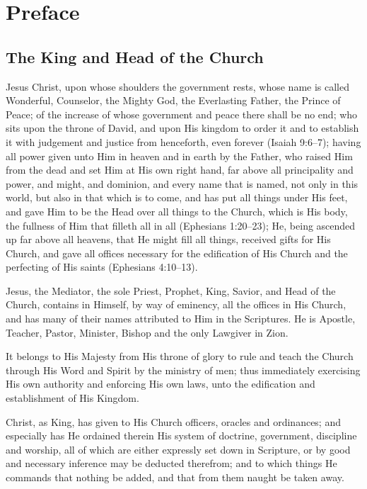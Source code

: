 \documentclass[
]{book}
\begin{document}
\hypertarget{preface}{%
\chapter{Preface}\label{preface}}

\hypertarget{the-king-and-head-of-the-church}{%
\section*{The King and Head of the Church}\label{the-king-and-head-of-the-church}}

Jesus Christ, upon whose shoulders the government rests, whose name is called Wonderful, Counselor, the Mighty God, the Everlasting Father, the Prince of Peace; of the increase of whose government and peace there shall be no end; who sits upon the throne of David, and upon His kingdom to order it and to establish it with judgement and justice from henceforth, even forever (Isaiah 9:6--7); having all power given unto Him in heaven and in earth by the Father, who raised Him from the dead and set Him at His own right hand, far above all principality and power, and might, and dominion, and every name that is named, not only in this world, but also in that which is to come, and has put all things under His feet, and gave Him to be the Head over all things to the Church, which is His body, the fullness of Him that filleth all in all (Ephesians 1:20--23); He, being ascended up far above all heavens, that He might fill all things, received gifts for His Church, and gave all offices necessary for the edification of His Church and the perfecting of His saints (Ephesians 4:10--13).

Jesus, the Mediator, the sole Priest, Prophet, King, Savior, and Head of the Church, contains in Himself, by way of eminency, all the offices in His Church, and has many of their names attributed to Him in the Scriptures. He is Apostle, Teacher, Pastor, Minister, Bishop and the only Lawgiver in Zion.

It belongs to His Majesty from His throne of glory to rule and teach the Church through His Word and Spirit by the ministry of men; thus immediately exercising His own authority and enforcing His own laws, unto the edification and establishment of His Kingdom.

Christ, as King, has given to His Church officers, oracles and ordinances; and especially has He ordained therein His system of doctrine, government, discipline and worship, all of which are either expressly set down in Scripture, or by good and necessary inference may be deducted therefrom; and to which things He commands that nothing be added, and that from them naught be taken away.
\end{document}
